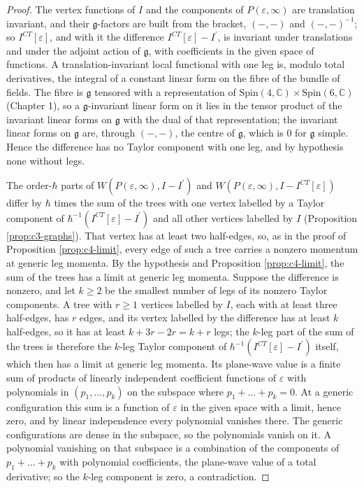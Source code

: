 \begin{proof}
The vertex functions of $I$ and the components of $P(\varepsilon,\infty)$ are translation invariant, and their $\mathfrak g$-factors are built from the bracket, $(-,-)$ and $(-,-)^{-1}$; so $I^{CT}[\varepsilon]$, and with it the difference $I^{CT}[\varepsilon]-I^{\prime}$, is invariant under translations and under the adjoint action of $\mathfrak g$, with coefficients in the given space of functions. A translation-invariant local functional with one leg is, modulo total derivatives, the integral of a constant linear form on the fibre of the bundle of fields. The fibre is $\mathfrak g$ tensored with a representation of $\mathrm{Spin}(4,\mathbb C)\times\mathrm{Spin}(6,\mathbb C)$ (Chapter 1), so a $\mathfrak g$-invariant linear form on it lies in the tensor product of the invariant linear forms on $\mathfrak g$ with the dual of that representation; the invariant linear forms on $\mathfrak g$ are, through $(-,-)$, the centre of $\mathfrak g$, which is $0$ for $\mathfrak g$ simple. Hence the difference has no Taylor component with one leg, and by hypothesis none without legs.

The order-$\hbar$ parts of $W(P(\varepsilon,\infty),I-I^{\prime})$ and $W(P(\varepsilon,\infty),I-I^{CT}[\varepsilon])$ differ by $\hbar$ times the sum of the trees with one vertex labelled by a Taylor component of $\hbar^{-1}(I^{CT}[\varepsilon]-I^{\prime})$ and all other vertices labelled by $I$ (Proposition \ref{prop:c3-graphs}). That vertex has at least two half-edges, so, as in the proof of Proposition \ref{prop:c4-limit}, every edge of such a tree carries a nonzero momentum at generic leg momenta. By the hypothesis and Proposition \ref{prop:c4-limit}, the sum of the trees has a limit at generic leg momenta. Suppose the difference is nonzero, and let $k\ge2$ be the smallest number of legs of its nonzero Taylor components. A tree with $r\ge1$ vertices labelled by $I$, each with at least three half-edges, has $r$ edges, and its vertex labelled by the difference has at least $k$ half-edges, so it has at least $k+3r-2r=k+r$ legs; the $k$-leg part of the sum of the trees is therefore the $k$-leg Taylor component of $\hbar^{-1}(I^{CT}[\varepsilon]-I^{\prime})$ itself, which then has a limit at generic leg momenta. Its plane-wave value is a finite sum of products of linearly independent coefficient functions of $\varepsilon$ with polynomials in $(p_1,\dots,p_k)$ on the subspace where $p_1+\dots+p_k=0$. At a generic configuration this sum is a function of $\varepsilon$ in the given space with a limit, hence zero, and by linear independence every polynomial vanishes there. The generic configurations are dense in the subspace, so the polynomials vanish on it. A polynomial vanishing on that subspace is a combination of the components of $p_1+\dots+p_k$ with polynomial coefficients, the plane-wave value of a total derivative; so the $k$-leg component is zero, a contradiction.
\end{proof}

